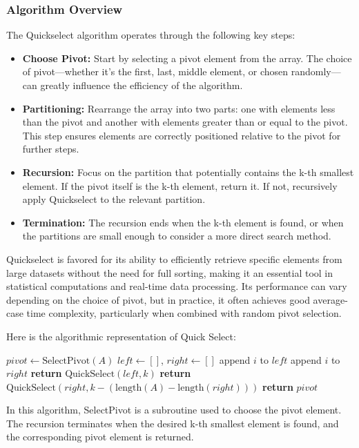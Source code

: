 \documentclass[12pt]{book} %
\begin{document}
\subsubsection{Algorithm Overview}

The Quickselect algorithm operates through the following key steps:
\begin{itemize}
    \item \textbf{Choose Pivot:} Start by selecting a pivot element from the array. The choice of pivot—whether it's the first, last, middle element, or chosen randomly—can greatly influence the efficiency of the algorithm.
    \item \textbf{Partitioning:} Rearrange the array into two parts: one with elements less than the pivot and another with elements greater than or equal to the pivot. This step ensures elements are correctly positioned relative to the pivot for further steps.
    \item \textbf{Recursion:} Focus on the partition that potentially contains the k-th smallest element. If the pivot itself is the k-th element, return it. If not, recursively apply Quickselect to the relevant partition.
    \item \textbf{Termination:} The recursion ends when the k-th element is found, or when the partitions are small enough to consider a more direct search method.
\end{itemize}

Quickselect is favored for its ability to efficiently retrieve specific elements from large datasets without the need for full sorting, making it an essential tool in statistical computations and real-time data processing. Its performance can vary depending on the choice of pivot, but in practice, it often achieves good average-case time complexity, particularly when combined with random pivot selection.


Here is the algorithmic representation of Quick Select:
\FloatBarrier
\begin{algorithm}[H]
\caption{Quick Select Algorithm}
\begin{algorithmic}[1]
\State $pivot \gets \text{SelectPivot}(A)$ 
\State $left \gets []$, $right \gets []$
\State append $i$ to $left$
\State append $i$ to $right$
\EndIf
\EndFor
{}
\State \textbf{return} $\text{QuickSelect}(left, k)$ 
\State \textbf{return} $\text{QuickSelect}(right, k - (\text{length}(A) - \text{length}(right)))$ 
\Else
\State \textbf{return} $pivot$ 
\EndIf
\EndProcedure
\end{algorithmic}
\end{algorithm}
\FloatBarrier
In this algorithm, SelectPivot is a subroutine used to choose the pivot element. The recursion terminates when the desired k-th smallest element is found, and the corresponding pivot element is returned.
\end{document}
